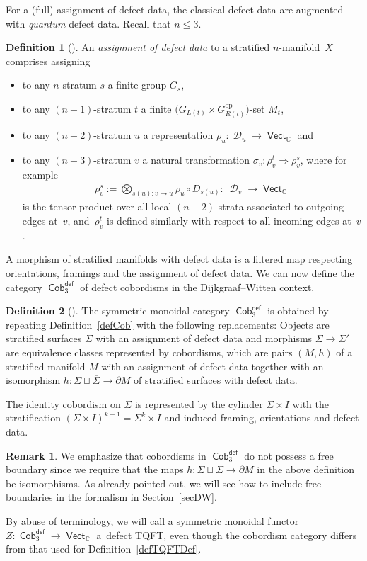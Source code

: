 \documentclass[pdftex]{sigma}
\DeclareMathOperator{\vect}{\mathsf{Vect}}
\DeclareMathOperator{\C}{\mathbb{C}}
\DeclareMathOperator{\Cob}{\mathsf{Cob}}
\DeclareMathOperator{\cald}{\mathcal{D}}
\numberwithin{equation}{section}
\theoremstyle{definition}
\newtheorem{Definition}[Definition]{Definition}
\newtheorem{Remark}[Remark]{Remark}
\begin{document}
For a (full) assignment of defect data, the classical defect data are augmented with \textit{quantum} defect data. Recall that $n \leq 3$.
\begin{Definition}[{\cite[Definition~4.4]{FMM}}]
 \label{defDefData}
 An \textit{assignment of defect data} to a stratified $n$-mani\-fold~$X$ comprises assigning
 \begin{itemize}\itemsep=0pt
 \item to any $n$-stratum $s$ a finite group $G_s$,
 \item to any $(n-1)$-stratum $t$ a finite $\bigl(G_{L(t)} \times G_{R(t)}^{\mathrm{op}}\bigr)$-set $M_t$,
 \item to any $(n-2)$-stratum $u$ a representation $\rho_u\colon \cald_u \rightarrow \vect_{\C}$ and
 \item to any $(n-3)$-stratum $v$ a natural transformation $\sigma_v\colon \rho_v^t \Rightarrow \rho_v^s$, where for example
 \begin{align*}
 \rho_v^s := \bigotimes_{s(u)\colon v \rightarrow u} \rho_u \circ D_{s(u)} \colon \ \cald_v \rightarrow \vect_{\C}
 \end{align*}
 is the tensor product over all local $(n-2)$-strata associated to outgoing edges at~$v$, and~$\rho_v^t$ is defined similarly with respect to all incoming edges at~$v$.
 \end{itemize}
\end{Definition}
A morphism of stratified manifolds with defect data is a filtered map respecting orientations, framings and the assignment of defect data. We can now define the category $\Cob_3^{\mathsf{def}}$ of defect cobordisms in the Dijkgraaf--Witten context.
\begin{Definition}[{\cite[Definition~4.6]{FMM}}] \label{defCobDW}
 The symmetric monoidal category $\Cob_3^{\mathsf{def}}$ is obtained by repeating Definition~\ref{defCob} with the following replacements: Objects are stratified surfaces $\Sigma$ with an assignment of defect data and morphisms $\Sigma \rightarrow \Sigma'$ are equivalence classes represented by cobordisms, which are pairs $(M, h)$ of a stratified manifold $M$ with an assignment of defect data together with an isomorphism $h\colon \Sigma \sqcup \overline{\Sigma} \rightarrow \partial M $ of stratified surfaces with defect data.

 The identity cobordism on $\Sigma$ is represented by the cylinder $\Sigma \times I$ with the stratification $(\Sigma \times I)^{k+1} = \Sigma^k \times I$ and induced framing, orientations and defect data.
\end{Definition}
\begin{Remark}
 We emphasize that cobordisms in $\Cob_3^{\mathsf{def}}$ do not possess a free boundary since we require that the maps $h\colon \Sigma \sqcup \overline{\Sigma} \rightarrow \partial M $ in the above definition be isomorphisms. As already pointed out, we will see how to include free boundaries in the formalism in Section~\ref{secDW}.
\end{Remark}
By abuse of terminology, we will call a symmetric monoidal functor $Z\colon \Cob_3^{\mathsf{def}} \rightarrow \vect_{\C}$ a~defect TQFT, even though the cobordism category differs from that used for Definition~\ref{defTQFTDef}.
\end{document}
